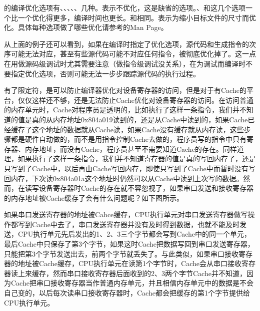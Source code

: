 的编译优化选项有、、、、、几种。表示不优化，这是缺省的选项。、和这几个选项一个比一个优化得更多，编译时间也更长。和相同。表示为缩小目标文件的尺寸而优化。具体每种选项做了哪些优化请参考的Man Page。



从上面的例子还可以看到，如果在编译时指定了优化选项，源代码和生成指令的次序可能无法对应，甚至有些源代码可能不对应任何指令，被彻底优化掉了。这一点在用做源码级调试时尤其需要注意（做指令级调试没关系），在为调试而编译时不要指定优化选项，否则可能无法一步步跟踪源代码的执行过程。



有了限定符，是可以防止编译器优化对设备寄存器的访问，但是对于有Cache的平台，仅仅这样还不够，还是无法防止Cache优化对设备寄存器的访问。在访问普通的内存单元时，Cache对程序员是透明的，比如执行了这样一条指令，我们并不知道的值是真的从内存地址0x804a019读到的，还是从Cache中读到的，如果Cache已经缓存了这个地址的数据就从Cache读，如果Cache没有缓存就从内存读，这些步骤都是硬件自动做的，而不是用指令控制Cache去做的，程序员写的指令中只有寄存器、内存地址，而没有Cache，程序员甚至不需要知道Cache的存在。同样道理，如果执行了这样一条指令，我们并不知道寄存器的值是真的写回内存了，还是只写到了Cache中，以后再由Cache写回内存，即使只写到了Cache中而暂时没有写回内存，下次读0x804a01a这个地址时仍然可以从Cache中读到上次写的数据。然而，在读写设备寄存器时Cache的存在就不容忽视了，如果串口发送和接收寄存器的内存地址被Cache缓存了会有什么问题呢？如下图所示。




如果串口发送寄存器的地址被Cahce缓存，CPU执行单元对串口发送寄存器做写操作都写到Cache中去了，串口发送寄存器并没有及时得到数据，也就不能及时发送，CPU执行单元先后发出的1、2、3三个字节都会写到Cache中的同一个单元，最后Cache中只保存了第3个字节，如果这时Cache把数据写回到串口发送寄存器，只能把第3个字节发送出去，前两个字节就丢失了。与此类似，如果串口接收寄存器的地址被Cache缓存，CPU执行单元在读第1个字节时，Cache会从串口接收寄存器读上来缓存，然而串口接收寄存器后面收到的2、3两个字节Cache并不知道，因为Cache把串口接收寄存器当作普通内存单元，并且相信内存单元中的数据是不会自己变的，以后每次读串口接收寄存器时，Cache都会把缓存的第1个字节提供给CPU执行单元。



